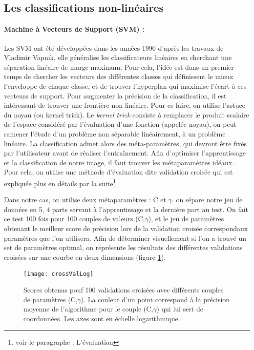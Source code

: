\documentclass[a4paper,10pt]{report}
\begin{document}
     

\subsection{Les classifications non-linéaires}
\paragraph{Machine à Vecteurs de Support (SVM) :}

Les SVM ont été développées dans les années 1990 d'après les travaux de Vladimir Vapnik, elle généralise les classificateurs linéaires en cherchant une séparation linéaire de marge maximum. Pour cela, l'idée est dans un premier temps de chercher les vecteurs des différentes classes qui définissent le mieux l'enveloppe de chaque classe, et de trouver l'hyperplan qui maximise l'écart à ces vecteurs de support.
Pour augmenter la précision de la classification, il est intéressant de trouver une frontière non-linéaire. Pour ce faire, on utilise l'astuce du noyau (ou kernel trick). Le \textit{kernel trick}\cite{aizermanSVM} consiste à remplacer le produit scalaire de l'espace considéré par l'évaluation d'une fonction (appelée noyau), on peut ramener l'étude d'un problème non séparable linéairement, à un problème linéaire. La classification admet alors des méta-paramètres, qui devront être fixés par l'utilisateur avant de réaliser l'entraînement. Afin d'optimiser l'apprentissage et la classification de notre image, il faut trouver les métaparamètres idéaux. Pour cela, on utilise une méthode d'évaluation dite validation croisée qui est expliquée plus en détails par la suite\footnote{voir le paragraphe : L'évaluation}

Dans notre cas, on utilise deux métaparamètres : C et $\gamma$. on sépare notre jeu de données en 5, 4 parts servant à l'apprentissage et la dernière part au test. On fait ce test 100 fois pour 100 couples de valeurs (C,$\gamma$), et le jeu de paramètres obtenant le meilleur score de précision lors de la validation croisée correspondaux paramètres que l'on utilisera. Afin de déterminer visuellement si l'on a trouvé un set de paramètres optimal, on représente les résultats des différentes validations croisées sur une courbe en deux dimensions (figure \ref{fig:crossMap}).

\begin{figure}
  \centering
    \texttt{[image: crossValLog]}
  \caption{Scores obtenus pouf 100 validations croisées avec différents couples de paramètres (C,$\gamma$). La couleur d'un point correspond à la précision moyenne de l'algorithme pour le couple (C,$\gamma$) qui lui sert de coordonnées. Les axes sont en échelle logarithmique.}
  \label{fig:crossMap}
\end{figure}
\end{document}
